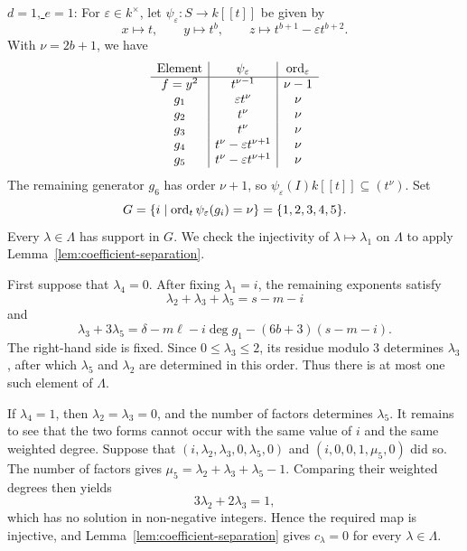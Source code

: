\medskip

\noindent
\underline{$d=1$, $e=1$}:
For $\varepsilon\in k^\times$, let $\psi_\varepsilon\colon S\to k[[t]]$
be given by
$$
x\longmapsto t,\qquad
y\longmapsto t^b,\qquad
z\longmapsto t^{b+1}-\varepsilon t^{b+2}.
$$
With $\nu=2b+1$, we have
\[
\begin{array}{c|c|c}
 \text{Element}&\psi_\varepsilon&\operatorname{ord}_\varepsilon\\ \hline
 f=y^2&t^{\nu-1}&\nu-1\\
 g_1&\varepsilon t^\nu&\nu\\
 g_2&t^\nu&\nu\\
 g_3&t^\nu&\nu\\
 g_4&t^\nu-\varepsilon t^{\nu+1}&\nu\\
 g_5&t^\nu-\varepsilon t^{\nu+1}&\nu
\end{array}
\]
The remaining generator $g_6$ has order $\nu+1$, so
$\psi_\varepsilon(I)k[[t]]\subseteq(t^\nu)$. Set
\[
 G=\{i\mid\operatorname{ord}_t\psi_\varepsilon(g_i)=\nu\}=\{1,2,3,4,5\}.
\]
Every $\lambda\in\Lambda$ has support in $G$.
We check the injectivity of $\lambda\mapsto\lambda_1$ on $\Lambda$
to apply Lemma~\ref{lem:coefficient-separation}.


First suppose that $\lambda_4=0$.  After fixing $\lambda_1=i$, the remaining
exponents satisfy
$$
\lambda_2+\lambda_3+\lambda_5=s-m-i
$$
and
$$
\lambda_3+3\lambda_5
=\delta-m\ell-i\deg g_1-(6b+3)(s-m-i).
$$
The right-hand side is fixed.  Since $0\leq\lambda_3\leq2$, its residue
modulo $3$ determines $\lambda_3$, after which $\lambda_5$ and $\lambda_2$
are determined in this order.  Thus there is at most one such element of
$\Lambda$.

If $\lambda_4=1$, then $\lambda_2=\lambda_3=0$, and the number of factors
determines $\lambda_5$.  It remains to see that the two forms cannot occur
with the same value of $i$ and the same weighted degree.  Suppose that
$(i,\lambda_2,\lambda_3,0,\lambda_5,0)$ and
$(i,0,0,1,\mu_5,0)$ did so.  The number of factors gives
$\mu_5=\lambda_2+\lambda_3+\lambda_5-1$.  Comparing their weighted degrees
then yields
$$
3\lambda_2+2\lambda_3=1,
$$
which has no solution in non-negative integers. Hence the required
map is injective, and Lemma~\ref{lem:coefficient-separation} gives
$c_\lambda=0$ for every $\lambda\in\Lambda$.


\medskip

